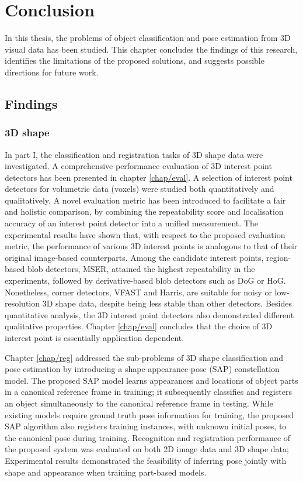 \chapter{Conclusion}
\label{chap/conclusion}

In this thesis, the problems of object classification and pose estimation from 3D visual data has been studied. This chapter concludes the findings of this research, identifies the limitations of the proposed solutions, and suggests possible directions for future work.  

\section{Findings}

\subsection{3D shape}

In part I, the classification and registration tasks of 3D shape data were investigated. A comprehensive performance evaluation of 3D interest point detectors has been presented in chapter \ref{chap/eval}. A selection of interest point detectors for volumetric data (voxels) were studied both quantitatively and qualitatively. A novel evaluation metric has been introduced to facilitate a fair and holistic comparison, by combining the repeatability score and localisation accuracy of an interest point detector into a unified measurement. The experimental results have shown that, with respect to the proposed evaluation metric, the performance of various 3D interest points is analogous to that of their original image-based counterparts. Among the candidate interest points, region-based blob detectors, \eg MSER, attained the highest repeatability in the experiments, followed by derivative-based blob detectors such as DoG or HoG. Nonetheless, corner detectors, \eg VFAST and Harris, are suitable for noisy or low-resolution 3D shape data, despite being less stable than other detectors. Besides quantitative analysis, the 3D interest point detectors also demonstrated different qualitative properties. Chapter \ref{chap/eval} concludes that the choice of 3D interest point is essentially application dependent. 

Chapter \ref{chap/reg} addressed the sub-problems of 3D shape classification and pose estimation by introducing a shape-appearance-pose (SAP) constellation model. The proposed SAP model learns appearances and locations of object parts in a canonical reference frame in training; it subsequently classifies and registers an object simultaneously to the canonical reference frame in testing. While existing models require ground truth pose information for training, the proposed SAP algorithm also registers training instances, with unknown initial poses, to the canonical pose during training. Recognition and registration performance of the proposed system was evaluated on both 2D image data and 3D shape data; Experimental results demonstrated the feasibility of inferring pose jointly with shape and appearance when training part-based models. 

